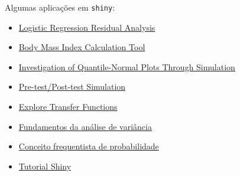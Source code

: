 \begin{frame}
  Algumas aplicações em \texttt{shiny}:
  \begin{itemize}
  \item \href{http://www.stat.cmu.edu:3838/hseltman/LogReg/}{Logistic
      Regression Residual Analysis}
  \item \href{https://ilame.shinyapps.io/Test3}{Body Mass Index
      Calculation Tool}
  \item
    \href{https://hseltman.shinyapps.io/QuantileNormal}{Investigation of
      Quantile-Normal Plots Through Simulation}
  \item
    \href{http://www.stat.cmu.edu:3838/hseltman/PrePost/}{
      Pre-test/Post-test Simulation}
  \item
    \href{http://www.stat.cmu.edu:3838/hseltman/TransferFunctions/}{
      Explore Transfer Functions}
  \item
    \href{http://nbcgib.uesc.br/lec/avale-es/amb-virtual/inferencia/anava}{
      Fundamentos da análise de variância}
  \item
    \href{http://nbcgib.uesc.br/lec/avale-es/amb-virtual/probabilidade/con-frequentista}{
      Conceito frequentista de probabilidade}
  \end{itemize}

\end{frame}

\begin{frame}
  \begin{itemize}
    \item \href{run:../shiny/shiny-pres.html}{Tutorial Shiny}
  \end{itemize}
\end{frame}
